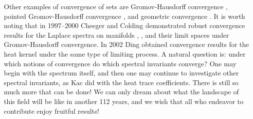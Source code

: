 \documentclass{amsart}
\theoremstyle{definition}
\begin{document}
Other examples of convergence of sets are Gromov-Hausdorff convergence \cite[\S5]{petruninlectures}, pointed Gromov-Hausdorff convergence \cite{jansen2017notes}, and geometric convergence \cite{anderson2004boundary}.  It is worth noting that in 1997--2000 Cheeger and Colding demonstrated robust convergence results for the Laplace spectra on manifolds \cite{cc1}, \cite{cc2}, \cite{cc3} and their limit spaces under Gromov-Hausdorff convergence. In 2002 Ding obtained convergence results for the heat kernel \cite{ding2002} under the same type of limiting process. A natural question is: under which notions of convergence do which spectral invariants converge?  One may begin with the spectrum itself, and then one may continue to investigate other spectral invariants, as Kac did with the heat trace coefficients.  There is still so much more that can be done! We can only dream about what the landscape of this field will be like in another 112 years, and we wish that all who endeavor to contribute enjoy fruitful results!  
\end{document}
